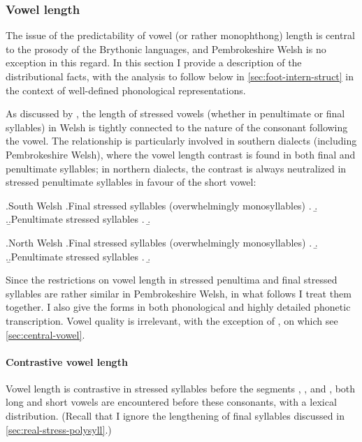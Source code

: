\subsubsection{Vowel length}
\label{sec:vowel-length}

The issue of the predictability of vowel (or rather monophthong) length is central to the prosody of the Brythonic languages, and Pembrokeshire Welsh is no exception in this regard. In this section I provide a description of the distributional facts, with the analysis to follow below in \cref{sec:foot-intern-struct} in the context of well-defined phonological representations.

As discussed by \citet{welshphonotactics,awbery86:_pembr_welsh}, the length of stressed vowels (whether in penultimate or final syllables) in Welsh is tightly connected to the nature of the consonant following the vowel. The relationship is particularly involved in southern dialects (including Pembrokeshire Welsh), where the vowel length contrast is found in both final and penultimate syllables; in northern dialects, the contrast is always neutralized in stressed penultimate syllables in favour of the short vowel:

\ex.South Welsh
\a.Final stressed syllables (overwhelmingly monosyllables)
\a.
\b.
\z.\b.Penultimate stressed syllables
\a.
\b.

\ex.\label{ex:northwelsh-vowel-length}North Welsh
\a.Final stressed syllables (overwhelmingly monosyllables)
\a.
\b.
\z.\b.Penultimate stressed syllables
\a.
\b.

Since the restrictions on vowel length in stressed penultima and final stressed syllables are rather similar in Pembrokeshire Welsh, in what follows I treat them together. I also give the forms in both phonological and highly detailed phonetic transcription. Vowel quality is irrelevant, with the exception of \ipa{[ə]}, on which see \cref{sec:central-vowel}.

\paragraph{Contrastive vowel length}
\label{sec:contr-vowel-length}

Vowel length is contrastive in stressed syllables before the segments \ipa{[n]}, \ipa{[l]}, and \ipa{[r]}, \ie both long and short vowels are encountered before these consonants, with a lexical distribution. (Recall that I ignore the lengthening of final syllables discussed in \cref{sec:real-stress-polysyll}.)

